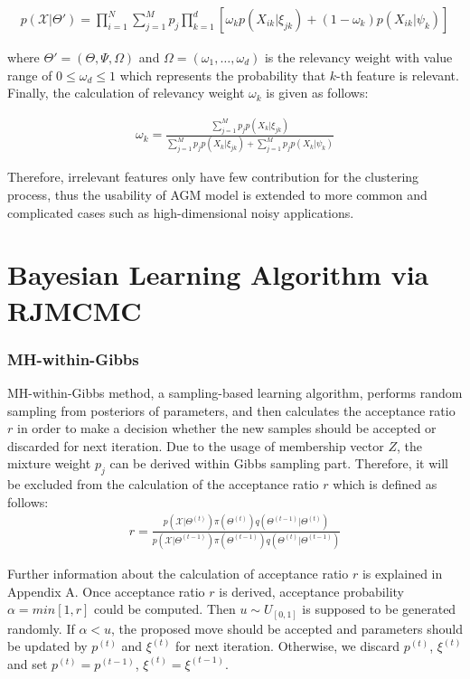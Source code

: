 \documentclass[conference]{IEEEtran}
\begin{document}
\begin{align}
p(\mathcal{X}|\Theta') = \prod_{i=1}^N \sum_{j=1}^Mp_j\prod_{k=1}^d[\omega_kp(X_{ik}|\xi_{jk})+(1-\omega_k)p(X_{ik}|\psi_{k})]
\label{eq:likelihoodFeatureComp}
\end{align}

where $\Theta'=(\Theta,\Psi,\Omega)$ and $\Omega = (\omega_1,\dots,\omega_d)$ is the relevancy weight with value range of $0 \leq \omega_d \leq 1$ which represents the probability that $k$-th feature is relevant. Finally, the calculation of relevancy weight $\omega_k$ is given as follows:

\begin{align}
\omega_k = \frac{\sum_{j=1}^Mp_jp(X_{k}|\xi_{jk})}{\sum_{j=1}^Mp_jp(X_{k}|\xi_{jk})+\sum_{j=1}^Mp_jp(X_{k}|\psi_{k})}
\label{eq:releWeight}
\end{align}

Therefore, irrelevant features only have few contribution for the clustering process, thus the usability of AGM model is extended to more common and complicated cases such as high-dimensional noisy applications.

\section{Bayesian Learning Algorithm via RJMCMC}
\subsubsection*{MH-within-Gibbs}
MH-within-Gibbs method, a sampling-based learning algorithm,  performs random sampling from posteriors of parameters, and then calculates the acceptance ratio $r$ in order to make a decision whether the new samples should be accepted or discarded for next iteration. Due to the usage of membership vector $Z$, the mixture weight $p_j$ can be derived within Gibbs sampling part. Therefore, it will be excluded from the calculation of the acceptance ratio $r$ which is defined as follows:
\begin{align}
r = \frac{p(\mathcal{X}|\Theta^{(t)})\pi(\Theta^{(t)})q(\Theta^{(t-1)}|\Theta^{(t)})}{p(\mathcal{X}|\Theta^{(t-1)})\pi(\Theta^{(t-1)})q(\Theta^{(t)}|\Theta^{(t-1)})}
\label{eq:r}
\end{align}

Further information about the calculation of acceptance ratio
$r$ is explained in Appendix A. Once acceptance ratio $r$ is derived, acceptance probability $\alpha = min[1,r]$ \cite{Luengo2013} could be computed. Then $u \sim U_{[0,1]}$ is supposed to be generated randomly. If $\alpha < u$, the proposed move should be accepted and parameters should be updated by $p^{(t)}$ and $\xi^{(t)}$ for next iteration. Otherwise, we discard $p^{(t)}$, $\xi^{(t)}$ and set $p^{(t)} = p^{(t-1)}$, $\xi^{(t)} = \xi^{(t-1)}$. 
\bigskip
\end{document}
